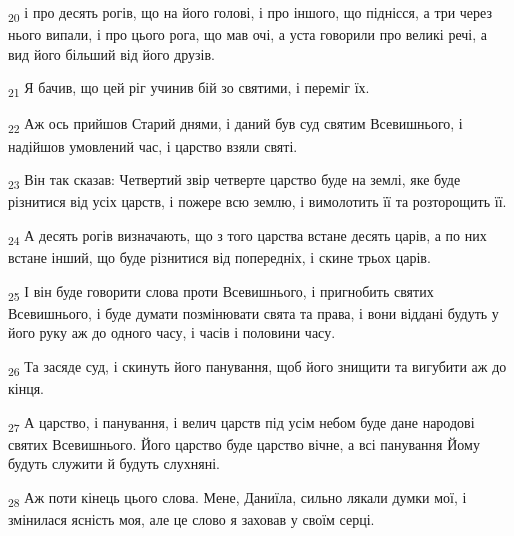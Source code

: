 \begin{tcolorbox}
\textsubscript{20} і про десять рогів, що на його голові, і про іншого, що піднісся, а три через нього випали, і про цього рога, що мав очі, а уста говорили про великі речі, а вид його більший від його друзів.
\end{tcolorbox}
\begin{tcolorbox}
\textsubscript{21} Я бачив, що цей ріг учинив бій зо святими, і переміг їх.
\end{tcolorbox}
\begin{tcolorbox}
\textsubscript{22} Аж ось прийшов Старий днями, і даний був суд святим Всевишнього, і надійшов умовлений час, і царство взяли святі.
\end{tcolorbox}
\begin{tcolorbox}
\textsubscript{23} Він так сказав: Четвертий звір четверте царство буде на землі, яке буде різнитися від усіх царств, і пожере всю землю, і вимолотить її та розторощить її.
\end{tcolorbox}
\begin{tcolorbox}
\textsubscript{24} А десять рогів визначають, що з того царства встане десять царів, а по них встане інший, що буде різнитися від попередніх, і скине трьох царів.
\end{tcolorbox}
\begin{tcolorbox}
\textsubscript{25} І він буде говорити слова проти Всевишнього, і пригнобить святих Всевишнього, і буде думати позмінювати свята та права, і вони віддані будуть у його руку аж до одного часу, і часів і половини часу.
\end{tcolorbox}
\begin{tcolorbox}
\textsubscript{26} Та засяде суд, і скинуть його панування, щоб його знищити та вигубити аж до кінця.
\end{tcolorbox}
\begin{tcolorbox}
\textsubscript{27} А царство, і панування, і велич царств під усім небом буде дане народові святих Всевишнього. Його царство буде царство вічне, а всі панування Йому будуть служити й будуть слухняні.
\end{tcolorbox}
\begin{tcolorbox}
\textsubscript{28} Аж поти кінець цього слова. Мене, Даниїла, сильно лякали думки мої, і змінилася ясність моя, але це слово я заховав у своїм серці.
\end{tcolorbox}
